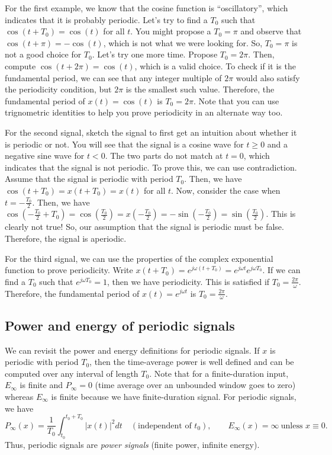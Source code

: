 For the first example, we know that the cosine function is ``oscillatory'', which indicates that it is probably periodic. Let's try to find a $T_0$ such that $\cos(t + T_0) = \cos(t)$ for all $t$. You might propose a $T_0 = \pi$ and observe that $\cos(t + \pi) = -\cos(t)$, which is not what we were looking for. So, $T_0 = \pi$ is not a good choice for $T_0$. Let's try one more time. Propose $T_0 = 2\pi$. Then, compute $\cos(t + 2\pi) = \cos(t)$, which is a valid choice. To check if it is the fundamental period, we can see that any integer multiple of $2\pi$ would also satisfy the periodicity condition, but $2\pi$ is the smallest such value. Therefore, the fundamental period of $x(t) = \cos(t)$ is $T_0 = 2\pi$. Note that you can use trignometric identities to help you prove periodicity in an alternate way too.

For the second signal, sketch the signal to first get an intuition about whether it is periodic or not. You will see that the signal is a cosine wave for $t \geq 0$ and a negative sine wave for $t < 0$. The two parts do not match at $t = 0$, which indicates that the signal is not periodic. To prove this, we can use contradiction. Assume that the signal is periodic with period $T_0$. Then, we have $\cos(t + T_0) = x(t + T_0) = x(t)$ for all $t$. Now, consider the case when $t = -\frac{T_0}{2}$. Then, we have $\cos(-\frac{T_0}{2} + T_0) = \cos(\frac{T_0}{2}) = x(-\frac{T_0}{2}) = -\sin(-\frac{T_0}{2}) = \sin(\frac{T_0}{2})$. This is clearly not true! So, our assumption that the signal is periodic must be false. Therefore, the signal is aperiodic.

For the third signal, we can use the properties of the complex exponential function to prove periodicity. Write $x(t + T_0) = e^{j\omega(t + T_0)} = e^{j\omega t}e^{j\omega T_0}$. If we can find a $T_0$ such that $e^{j\omega T_0} = 1$, then we have periodicity. This is satisfied if $T_0 = \frac{2\pi}{\omega}$. Therefore, the fundamental period of $x(t) = e^{j\omega t}$ is $T_0 = \frac{2\pi}{\omega}$.


\subsection{Power and energy of periodic signals}
We can revisit the power and energy definitions for periodic signals. If $x$ is periodic with period $T_0$, then the time-average power is well defined and can be computed over any interval of length $T_0$. Note that for a finite-duration input, $E_\infty$ is finite and $P_\infty=0$ (time average over an unbounded window goes to zero) whereas $E_\infty$ is finite because we have finite-duration signal. For periodic signals, we have
\[
P_\infty(x)=\frac{1}{T_0}\!\int_{t_0}^{t_0+T_0}\!|x(t)|^2 dt
\quad(\text{independent of }t_0),\qquad
E_\infty(x)=\infty\ \text{unless }x\equiv 0.
\]
Thus, periodic signals are \emph{power signals} (finite power, infinite energy).
